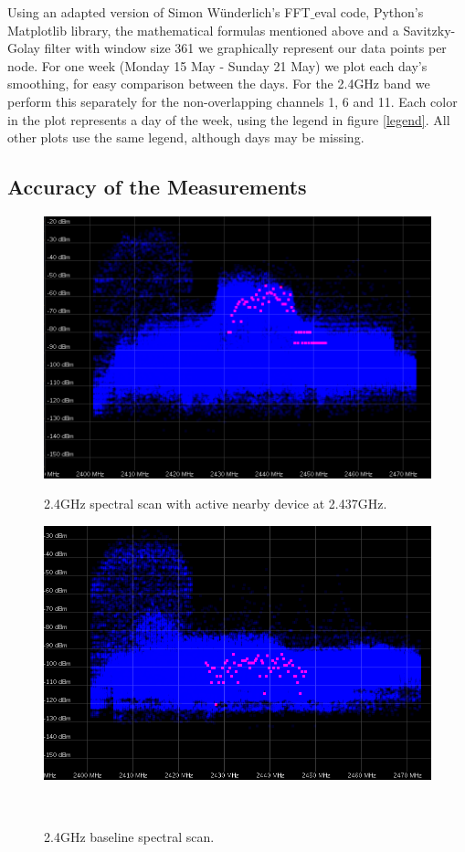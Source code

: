 \documentclass[a4paper, 11pt]{article}
\begin{document}
Using an adapted version of Simon W{\"u}nderlich's FFT$\_$eval code, Python's Matplotlib library, the mathematical formulas mentioned above and a Savitzky-Golay filter with window size 361 we graphically represent our data points per node. For one week (Monday 15 May - Sunday 21 May) we plot each day's smoothing, for easy comparison between the days. For the 2.4GHz band we perform this separately for the non-overlapping channels 1, 6 and 11. Each color in the plot represents a day of the week, using the legend in figure \ref{legend}. All other plots use the same legend, although days may be missing.



\subsection{Accuracy of the Measurements} \label{accuracy}

\begin{figure}[ht]
\begin{minipage}[t]{0.45\textwidth}
\centering
\includegraphics[width=\textwidth]{24check.png}
\caption{2.4GHz spectral scan with active nearby device at 2.437GHz.}
\label{fig_24}
\end{minipage}\hfill
\begin{minipage}[t]{0.45\textwidth}
\centering
\includegraphics[width=\textwidth]{24check_nodata.png}
\caption{2.4GHz baseline spectral scan.}
\label{fig_24nodata}
\end{minipage}\
\end{figure}
\end{document}
